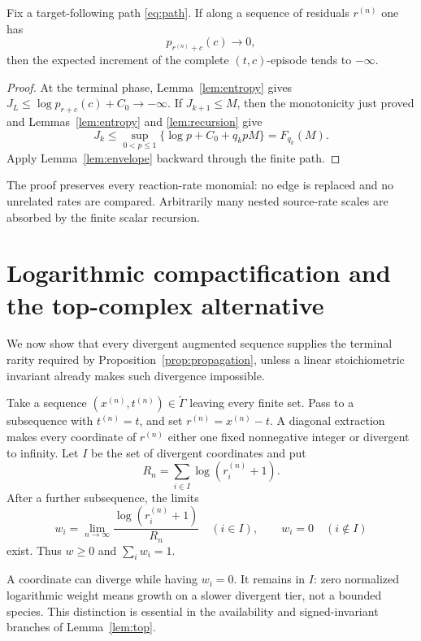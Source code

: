 \begin{proposition}\label{prop:propagation}
Fix a target-following path \eqref{eq:path}.  If along a sequence of residuals
\(r^{(n)}\) one has
\[
  p_{r^{(n)}+c}(c)\longrightarrow0,
\]
then the expected increment of the complete \((t,c)\)-episode tends to
\(-\infty\).
\end{proposition}

\begin{proof}
At the terminal phase, Lemma~\ref{lem:entropy} gives
\(J_L\le\log p_{r+c}(c)+C_0\to-\infty\).  If \(J_{k+1}\le M\), then the
monotonicity just proved and
Lemmas~\ref{lem:entropy} and \ref{lem:recursion} give
\[
  J_k\le\sup_{0<p\le1}\{\log p+C_0+q_kpM\}=F_{q_k}(M).
\]
Apply Lemma~\ref{lem:envelope} backward through the finite path.
\end{proof}

The proof preserves every reaction-rate monomial: no edge is replaced and no
unrelated rates are compared.  Arbitrarily many nested source-rate scales are
absorbed by the finite scalar recursion.

\section{Logarithmic compactification and the top-complex alternative}
\label{sec:compact}

We now show that every divergent augmented sequence supplies the terminal
rarity required by Proposition~\ref{prop:propagation}, unless a linear
stoichiometric invariant already makes such divergence impossible.

Take a sequence \((x^{(n)},t^{(n)})\in\widetilde\Gamma\) leaving every finite
set.  Pass to a subsequence with \(t^{(n)}=t\), and set
\(r^{(n)}=x^{(n)}-t\).  A diagonal extraction makes every coordinate of
\(r^{(n)}\) either one fixed nonnegative integer or divergent to infinity.
Let \(I\) be the set of divergent coordinates and put
\begin{equation}\label{eq:Rn}
  R_n=\sum_{i\in I}\log(r_i^{(n)}+1).
\end{equation}
After a further subsequence, the limits
\begin{equation}\label{eq:weights}
  w_i=\lim_{n\to\infty}
  \frac{\log(r_i^{(n)}+1)}{R_n}
  \quad(i\in I),
  \qquad w_i=0\quad(i\notin I)
\end{equation}
exist.  Thus \(w\ge0\) and \(\sum_iw_i=1\).

\begin{remark}\label{rem:zero-weight}
A coordinate can diverge while having \(w_i=0\).  It remains in \(I\): zero
normalized logarithmic weight means growth on a slower divergent tier, not a
bounded species.  This distinction is essential in the availability and
signed-invariant branches of Lemma~\ref{lem:top}.
\end{remark}

